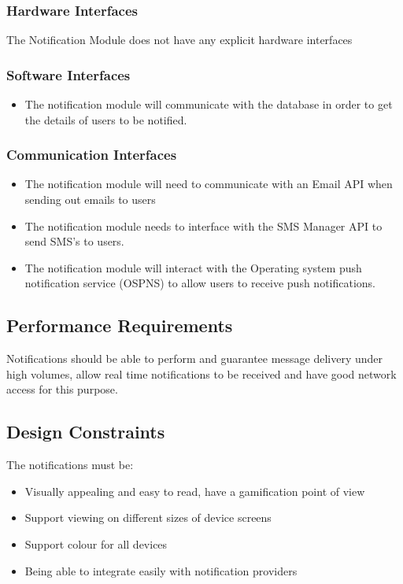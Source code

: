 \subsubsection{Hardware Interfaces}
The Notification Module does not have any explicit hardware interfaces

\subsubsection{Software Interfaces}
  \begin{itemize}
  	\item The notification module will communicate with the database in order to get the details of users to be notified.
  \end{itemize}
  
\subsubsection{Communication Interfaces}
	\begin{itemize}
		\item The notification module will need to communicate with an Email API when sending out emails to users
		\item The notification module needs to interface with the SMS Manager API to send SMS's to users.
		\item The notification module will interact with the Operating system push notification service (OSPNS) to allow users to receive push notifications.
	\end{itemize}
	
\subsection{Performance Requirements}
Notifications should be able to perform and guarantee message delivery under high volumes, allow real time notifications to be received and have good network access for this purpose. 

\subsection{Design Constraints}
The notifications must be:
\begin{itemize}
	\item Visually appealing and easy to read, have a gamification point of view
	\item Support viewing on different sizes of device screens
	\item Support colour for all devices
	\item Being able to integrate easily with notification providers
\end{itemize}


